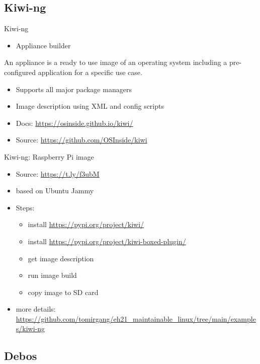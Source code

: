 \documentclass{beamer}
\begin{document}
\subsection{Kiwi-ng}

\begin{frame}{Kiwi-ng}
	\begin{itemize}
		\item Appliance builder
	\end{itemize}
	\begin{definition} 
		An appliance is a ready to use image of an operating system including a pre-configured application for a specific use case. 
	\end{definition}
	\begin{itemize}
		\item Supports all major package managers
		\item Image description using XML and config scripts
		\item Docs: \url{https://osinside.github.io/kiwi/}
		\item Source: \url{https://github.com/OSInside/kiwi}
	\end{itemize}
\end{frame}

\begin{frame}{Kiwi-ng: Raspberry Pi image}
	\begin{itemize}
		\item Source: \url{https://t.ly/f3ubM}
		\item based on Ubuntu Jammy
		\item Steps:
		\begin{itemize}
			\item install \url{https://pypi.org/project/kiwi/}
			\item install \url{https://pypi.org/project/kiwi-boxed-plugin/}
			\item get image description
			\item run image build
			\item copy image to SD card
		\end{itemize}
		\item more details: \url{https://github.com/tomirgang/eh21_maintainable_linux/tree/main/examples/kiwi-ng}
	\end{itemize}
\end{frame}

\subsection{Debos}
\end{document}
